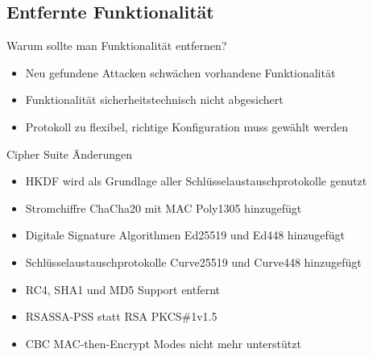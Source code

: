 \documentclass{f4_beamer_metropolis}
\begin{document}
\subsection{Entfernte Funktionalität}

\begin{frame}{Warum sollte man Funktionalität entfernen?}
  \begin{overlayarea}{\textwidth}{.5\textheight}
  \begin{itemize}
    \item<2-> Neu gefundene Attacken schwächen vorhandene Funktionalität
    \item<3-> Funktionalität sicherheitstechnisch nicht abgesichert
    \item<4-> Protokoll zu flexibel, richtige Konfiguration muss gewählt werden
    \end{itemize}
  \end{overlayarea}

\end{frame}

\begin{frame}{Cipher Suite Änderungen}
  \begin{itemize}
  \item HKDF wird als Grundlage aller Schlüsselaustauschprotokolle genutzt
  \item Stromchiffre ChaCha20 mit MAC Poly1305 hinzugefügt
  \item Digitale Signature Algorithmen Ed25519 und Ed448 hinzugefügt
  \item Schlüsselaustauschprotokolle Curve25519 und Curve448 hinzugefügt
  \item RC4, SHA1 und MD5 Support entfernt \autocite{rc4.nomore} \autocite{shattered}
  \item RSASSA-PSS statt RSA PKCS\#1v1.5
  \item CBC MAC-then-Encrypt Modes nicht mehr unterstützt
\end{itemize}
\end{frame}
\end{document}
